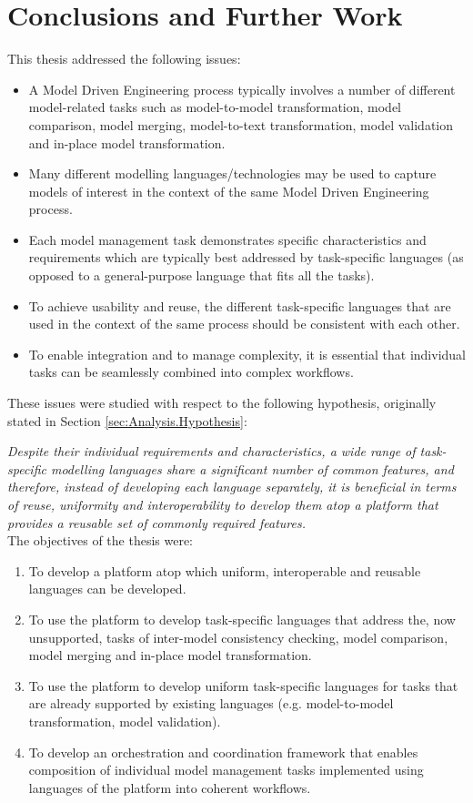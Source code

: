 \chapter{Conclusions and Further Work}
\label{chp:Conclusions}

This thesis addressed the following issues:

\begin{itemize}
	\item A Model Driven Engineering process typically involves a number of different model-related tasks such as model-to-model transformation, model comparison, model merging, model-to-text transformation, model validation and in-place model transformation.
	\item Many different modelling languages/technologies may be used to capture models of interest in the context of the same Model Driven Engineering process.
	\item Each model management task demonstrates specific characteristics and requirements which are typically best addressed by task-specific languages (as opposed to a general-purpose language that fits all the tasks).
	\item To achieve usability and reuse, the different task-specific languages that are used in the context of the same process should be consistent with each other.
	\item To enable integration and to manage complexity, it is essential that individual tasks can be seamlessly combined into complex workflows.
\end{itemize}

These issues were studied with respect to the following hypothesis, originally stated in Section \ref{sec:Analysis.Hypothesis}:

\textit{Despite their individual requirements and characteristics, a wide range of task-specific modelling languages share a significant number of common features, and therefore, instead of developing each language separately, it is beneficial in terms of reuse, uniformity and interoperability to develop them atop a platform that provides a reusable set of commonly required features.}\\
 
The objectives of the thesis were:

\begin{enumerate}
	\item To develop a platform atop which uniform, interoperable and reusable languages can be developed.
	\item To use the platform to develop task-specific languages that address the, now unsupported, tasks of inter-model consistency checking, model comparison, model merging and in-place model transformation.
	\item To use the platform to develop uniform task-specific languages for tasks that are already supported by existing languages (e.g. model-to-model transformation, model validation).
	\item To develop an orchestration and coordination framework that enables composition of individual model management tasks implemented using languages of the platform into coherent workflows. 
\end{enumerate}

